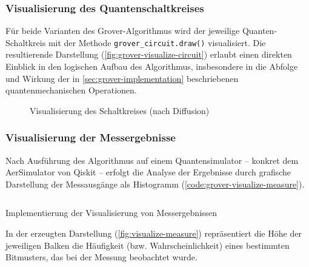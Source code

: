 \subsubsection*{Visualisierung des Quantenschaltkreises}
\label{sec:grover-visualization}

Für beide Varianten des Grover-Algorithmus wird der jeweilige Quanten-Schaltkreis mit der Methode \texttt{grover_circuit.draw()} visualisiert. Die resultierende Darstellung (\autoref{fig:grover-visualize-circuit}) erlaubt einen direkten Einblick in den logischen Aufbau des Algorithmus, insbesondere in die Abfolge und Wirkung der in \autoref{sec:grover-implementation} beschriebenen quantenmechanischen Operationen.

\begin{figure}
    \centering
    \caption{Visualisierung des Schaltkreises (nach Diffusion)}
    \label{fig:grover-visualize-circuit}
\end{figure}

\subsubsection*{Visualisierung der Messergebnisse}

Nach Ausführung des Algorithmus auf einem Quantensimulator – konkret dem AerSimulator von Qiskit – erfolgt die Analyse der Ergebnisse durch grafische Darstellung der Messausgänge als Histogramm (\autoref{code:grover-visualize-measure}).  

\begin{listing}[ht!]
  \inputminted{python}{code/quantum-software/grover-visualize-measure.py}
  \caption{Implementierung der Visualisierung von Messergebnissen}
  \label{code:grover-visualize-measure}
\end{listing}

In der erzeugten Darstellung (\autoref{fig:visualize-measure}) repräsentiert die Höhe der jeweiligen Balken die Häufigkeit (bzw. Wahrscheinlichkeit) eines bestimmten Bitmusters, das bei der Messung beobachtet wurde.

